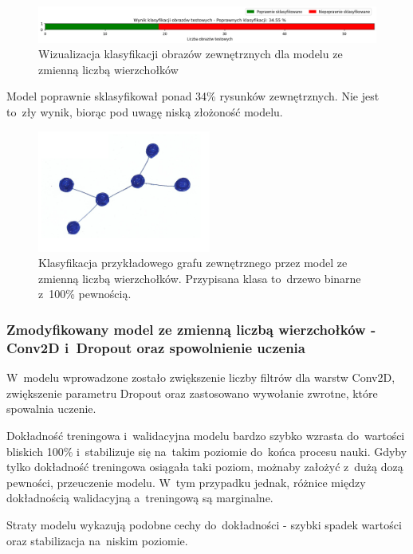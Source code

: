 \begin{figure}[ht]
	\centering
	\includegraphics[width=15.5cm]{resources/tests/images/v3/multiple_edges_bar.png}
	\caption{Wizualizacja klasyfikacji obrazów zewnętrznych dla modelu ze zmienną liczbą wierzchołków}
	\label{Fig:tests-var-0c}
\end{figure}
\FloatBarrier

Model poprawnie sklasyfikował ponad 34\% rysunków zewnętrznych.
Nie jest to~zły wynik, biorąc pod uwagę niską złożoność modelu.

\begin{figure}[ht]
	\centering
	\includegraphics[height=4cm]{../graph_classification/test_graphs/drawn/tree-binary-1.png}
	\caption{Klasyfikacja przykładowego grafu zewnętrznego przez model ze zmienną liczbą wierzchołków.
		Przypisana klasa to~drzewo binarne z~100\% pewnością.}
	\label{Fig:tests-var-0d}
\end{figure}
\FloatBarrier

\subsubsection{Zmodyfikowany model ze zmienną liczbą wierzchołków - Conv2D i~Dropout oraz spowolnienie uczenia}

W~modelu wprowadzone zostało zwiększenie liczby filtrów dla warstw Conv2D, zwiększenie parametru Dropout
oraz zastosowano wywołanie zwrotne, które spowalnia uczenie.

Dokładność treningowa i~walidacyjna modelu bardzo szybko wzrasta do~wartości bliskich 100\%
i~stabilizuje się na~takim poziomie do~końca procesu nauki.
Gdyby tylko dokładność treningowa osiągała taki poziom, możnaby założyć z~dużą dozą pewności, przeuczenie modelu.
W~tym przypadku jednak, różnice między dokładnością walidacyjną a~treningową są marginalne.

Straty modelu wykazują podobne cechy do~dokładności - szybki spadek wartości oraz stabilizacja na~niskim poziomie.

